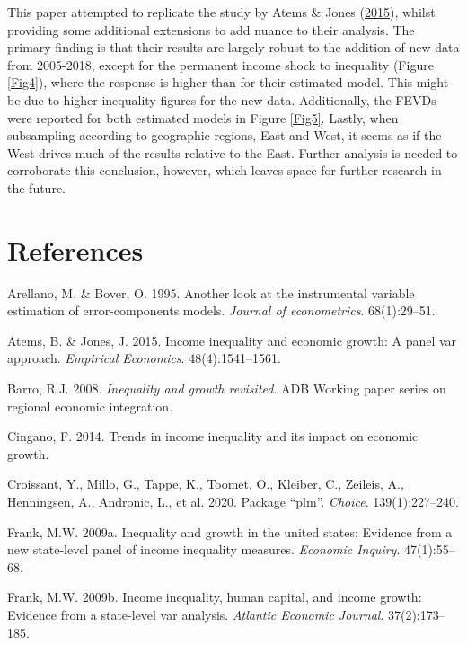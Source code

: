 \documentclass[11pt,preprint, authoryear]{elsarticle}
\numberwithin{equation}{section}
\numberwithin{figure}{section}
\numberwithin{table}{section}
\begin{document}
This paper attempted to replicate the study by Atems \& Jones
(\protect\hyperlink{ref-atems}{2015}), whilst providing some additional
extensions to add nuance to their analysis. The primary finding is that
their results are largely robust to the addition of new data from
2005-2018, except for the permanent income shock to inequality (Figure
\ref{Fig4}), where the response is higher than for their estimated
model. This might be due to higher inequality figures for the new data.
Additionally, the FEVDs were reported for both estimated models in
Figure \ref{Fig5}. Lastly, when subsampling according to geographic
regions, East and West, it seems as if the West drives much of the
results relative to the East. Further analysis is needed to corroborate
this conclusion, however, which leaves space for further research in the
future.

\newpage

\hypertarget{references}{%
\section*{References}\label{references}}

\hypertarget{refs}{}
\leavevmode\hypertarget{ref-arellano}{}%
Arellano, M. \& Bover, O. 1995. Another look at the instrumental
variable estimation of error-components models. \emph{Journal of
econometrics}. 68(1):29--51.

\leavevmode\hypertarget{ref-atems}{}%
Atems, B. \& Jones, J. 2015. Income inequality and economic growth: A
panel var approach. \emph{Empirical Economics}. 48(4):1541--1561.

\leavevmode\hypertarget{ref-barro}{}%
Barro, R.J. 2008. \emph{Inequality and growth revisited}. ADB Working
paper series on regional economic integration.

\leavevmode\hypertarget{ref-cingano}{}%
Cingano, F. 2014. Trends in income inequality and its impact on economic
growth.

\leavevmode\hypertarget{ref-croissant2020package}{}%
Croissant, Y., Millo, G., Tappe, K., Toomet, O., Kleiber, C., Zeileis,
A., Henningsen, A., Andronic, L., et al. 2020. Package ``plm''.
\emph{Choice}. 139(1):227--240.

\leavevmode\hypertarget{ref-frank}{}%
Frank, M.W. 2009a. Inequality and growth in the united states: Evidence
from a new state-level panel of income inequality measures.
\emph{Economic Inquiry}. 47(1):55--68.

\leavevmode\hypertarget{ref-frankincome}{}%
Frank, M.W. 2009b. Income inequality, human capital, and income growth:
Evidence from a state-level var analysis. \emph{Atlantic Economic
Journal}. 37(2):173--185.
\end{document}

